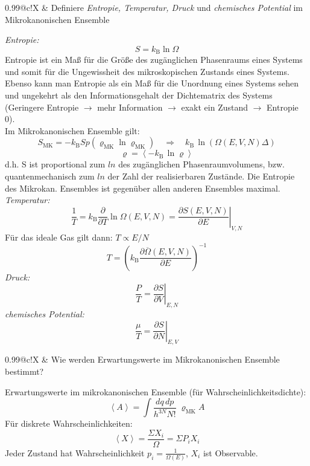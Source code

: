 \documentclass[a4paper,12pt]{scrartcl}
\makeatletter
\def\kb#1{\left\langle #1\right\rangle}			%
\def\rk{\right)}					%
\def\lk{\left(}						%
\def\rsp{\right>}					%
\def\lsp{\left<}					%
\def\kB{k_\mathrm{B}}					%
\newcounter{qc}\setcounter{qc}{1}
\newenvironment{fshaded}{
\def\FrameCommand{\fcolorbox{framecolor}{shadecolor}}
\MakeFramed {\FrameRestore}}
{\endMakeFramed}
\def\frage#1{
\begin{fshaded}
\noindent
\begin{tabularx}{0.99\textwidth}{@{}c!{\color{framecolor}\vline}X}
{ \bf \rm \theqc }	&	\noindent #1
\end{tabularx}
\stepcounter{qc}
\end{fshaded}
}
\makeatother
\begin{document}
\frage{Definiere \textit{Entropie, Temperatur, Druck} und \textit{chemisches Potential} im Mikrokanonischen Ensemble}
\noindent
\textit{Entropie:}
\[S=k_\mathrm{B}\ln{\Omega}\]
Entropie ist ein Maß für die Größe des zugänglichen Phasenraums eines Systems und somit für die Ungewissheit des 
mikroskopischen Zustands eines Systems. Ebenso kann man Entropie als ein Maß für die Unordnung eines Systems sehen und 
ungekehrt als den Informationsgehalt der Dichtematrix des Systems (Geringere Entropie $\rightarrow$ mehr Information 
$\rightarrow$ exakt ein Zustand $\rightarrow$ Entropie 0).\\
Im Mikrokanonischen Ensemble gilt:
\[S_\mathrm{MK}=-\kB  Sp(\varrho_\mathrm{MK} \ln{\varrho_\mathrm{MK}}) \quad \Rightarrow \quad \kB \,\ln{(\Omega(E,V,N) \Delta)}\]
\[\varrho=\kb{-\kB \,\ln{\varrho}}\]
d.h. S ist proportional zum $ln$ des zugänglichen Phasenraumvolumens, bzw. quantenmechanisch zum $ln$ der Zahl der 
realisierbaren Zustände. Die Entropie des Mikrokan. Ensembles ist gegenüber allen anderen Ensembles maximal.\\
\textit{Temperatur:}
\[\frac{1}{T} =\kB  \frac{\partial}{\partial T} \ln{\Omega(E,V,N)}= \left. \frac{\partial S(E,V,N)}{\partial E} \right|_{V,N}\]
Für das ideale Gas gilt dann: $T \propto E/N$
\[T=\lk{\kB \frac{\partial\overline{\Omega}(E,V,N)}{\partial E}}\rk^{-1}\]
\textit{Druck:}
\[\frac{P}{T}=\left. \frac{\partial S}{\partial V} \right|_{E,N}\]
\textit{chemisches Potential:}
\[\frac{\mu}{T}=\left. \frac{\partial S}{\partial N} \right|_{E,V}\]


\frage{Wie werden Erwartungswerte im Mikrokanonischen Ensemble bestimmt?}
\noindent
Erwartungswerte im mikrokanonischen Ensemble (für Wahrscheinlichkeitsdichte):
\[\lsp{A}\rsp=\int \frac{dq\,dp}{h^{3N}N!}\; \varrho_\mathrm{MK}A\]
Für diskrete Wahrscheinlichkeiten:
\[\kb X=\frac{\Sigma X_i}{\Omega}=\Sigma P_iX_i\]
Jeder Zustand hat Wahrscheinlichkeit $p_i=\frac 1 {\Omega(E)}$, $X_i$ ist Observable.

\end{document}
